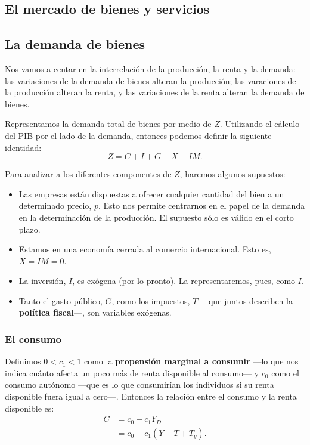 \documentclass[10pt]{article}
\begin{document}
\begin{multicols*}{2}
\section{El mercado de bienes y servicios}

\subsection{La demanda de bienes}
Nos vamos a centar en la interrelación de la producción, la renta y la demanda: las variaciones de la demanda de bienes alteran la producción; las varaciones de la producción alteran la renta, y las variaciones de la renta alteran la demanda de bienes.

Representamos la demanda total de bienes por medio de $Z$. Utilizando el cálculo del PIB por el lado de la demanda, entonces podemos definir la siguiente identidad:
\[ Z  = C + I + G + X - IM.\]

Para analizar a los diferentes componentes de $Z$, haremos algunos supuestos:
\begin{itemize}
    \item Las empresas están dispuestas a ofrecer cualquier cantidad del bien a un determinado precio, $p$. Esto nos permite centrarnos en el papel de la demanda en la determinación de la producción. El supuesto sólo es válido en el corto plazo.
    \item Estamos en una economía cerrada al comercio internacional. Esto es, $X=IM=0$.
    \item La inversión, $I$, es exógena (por lo pronto). La representaremos, pues, como $\bar{I}$.
    \item Tanto el gasto público, $G$, como los impuestos, $T$ ---que juntos describen la \textbf{política fiscal}---, son variables exógenas.
\end{itemize}

\subsubsection{El consumo}
Definimos $0<c_1<1$ como la \textbf{propensión marginal a consumir} ---lo que nos indica cuánto afecta un poco más de renta disponible al consumo--- y $c_0$ como el consumo autónomo ---que es lo que consumirían los individuos si su renta disponible fuera igual a cero---. Entonces la relación entre el consumo y la renta disponible es:
\begin{align*}
    C &= c_0 + c_1Y_D    \\
      &= c_0 + c_1(Y-T+T_g).
\end{align*}


\end{multicols*}
\end{document}
